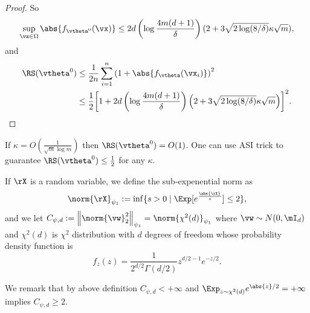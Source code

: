 \documentclass{article}
\begin{document}
\begin{proof}
    So
    \begin{equation}
        \sup_{\vx\in\Omega}\abs{f_{\vtheta^0}(\vx)}\leq 2d\left(\log\frac{4m(d+1)}{\delta}\right)(2+3\sqrt{2\log(8/\delta)}\kappa\sqrt{m}),
    \end{equation}
    and
    \begin{equation}
        \begin{aligned}
            \RS(\vtheta^0)
             & \leq\frac{1}{2n}\sum_{i=1}^n{\left(1+\abs{f_{\vtheta}(\vx_i)}\right)}^2                                                          \\
             & \leq\frac{1}{2}{\left[1+2d\left(\log\frac{4m(d+1)}{\delta}\right)\left(2+3\sqrt{2\log(8/\delta)}\kappa\sqrt{m}\right)\right]}^2.
        \end{aligned}
    \end{equation}
\end{proof}
\begin{rmk}
    If $\kappa=O(\frac{1}{\sqrt{m}\log m})$ then $\RS(\vtheta^0)=O(1)$. One can use ASI trick to guarantee $\RS(\vtheta^0)\leq\frac{1}{2}$ for any $\kappa$.
\end{rmk}
\begin{defi}
    If $\rX$ is a random variable, we define the sub-expenential norm as
    \begin{equation}
        \norm{\rX}_{\psi_1} := \inf\{s>0 \mid \Exp[e^{\frac{\abs{\rX}}{s}}]\leq 2\},
    \end{equation}
    and we let $C_{\psi,d}:=\left\lVert\norm{\vw}_2^2\right\rVert_{\psi_1} = \norm{\chi^2(d)}_{\psi_1}$ where $\vw\sim N(0,\mI_d)$ and $\chi^2(d)$ is $\chi^2$ distribution with $d$ degrees of freedom whose probability density function is
    \begin{equation}
        f_z(z)=\frac{1}{2^{d/2}\Gamma(d/2)}z^{d/2-1}e^{-z/2}.
    \end{equation}
\end{defi}
\begin{rmk}
    We remark that by above definition $C_{\psi,d}<+\infty$ and $\Exp_{z\sim\chi^2(d)}e^{\abs{z}/2}=+\infty$ implies $C_{\psi,d}\geq 2$.
\end{rmk}
\end{document}
